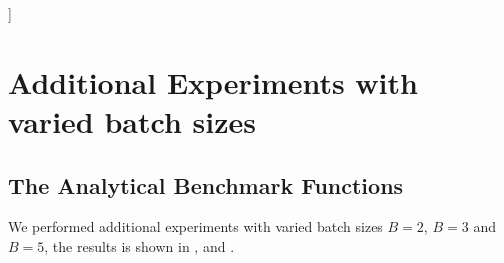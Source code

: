 \documentclass{article}
\begin{document}
\vskip 0.3in
]



\section{Additional Experiments with varied batch sizes}

\subsection{The Analytical Benchmark Functions}

We performed additional experiments with varied batch sizes $B = 2$, $B = 3$ and $B = 5$, the results is shown in ,  and .
\end{document}
